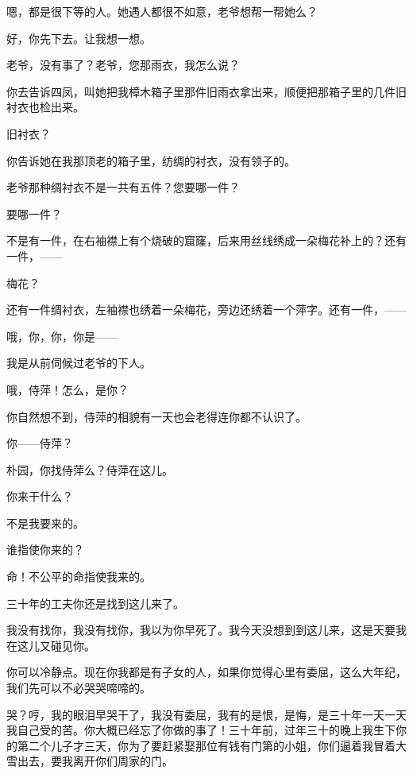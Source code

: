 嗯，都是很下等的人。她遇人都很不如意，老爷想帮一帮她么？

好，你先下去。让我想一想。

老爷，没有事了？老爷，您那雨衣，我怎么说？

你去告诉四凤，叫她把我樟木箱子里那件旧雨衣拿出来，顺便把那箱子里的几件旧衬衣也检出来。

旧衬衣？

你告诉她在我那顶老的箱子里，纺绸的衬衣，没有领子的。

老爷那种绸衬衣不是一共有五件？您要哪一件？

要哪一件？

不是有一件，在右袖襟上有个烧破的窟窿，后来用丝线绣成一朵梅花补上的？还有一件，——

梅花？

还有一件绸衬衣，左袖襟也绣着一朵梅花，旁边还绣着一个萍字。还有一件，——

哦，你，你，你是——

我是从前伺候过老爷的下人。

哦，侍萍！怎么，是你？

你自然想不到，侍萍的相貌有一天也会老得连你都不认识了。

你——侍萍？

朴园，你找侍萍么？侍萍在这儿。

你来干什么？

不是我要来的。

谁指使你来的？

命！不公平的命指使我来的。

三十年的工夫你还是找到这儿来了。

我没有找你，我没有找你，我以为你早死了。我今天没想到到这儿来，这是天要我在这儿又碰见你。

你可以冷静点。现在你我都是有子女的人，如果你觉得心里有委屈，这么大年纪，我们先可以不必哭哭啼啼的。

哭？哼，我的眼泪早哭干了，我没有委屈，我有的是恨，是悔，是三十年一天一天我自己受的苦。你大概已经忘了你做的事了！三十年前，过年三十的晚上我生下你的第二个儿子才三天，你为了要赶紧娶那位有钱有门第的小姐，你们逼着我冒着大雪出去，要我离开你们周家的门。

